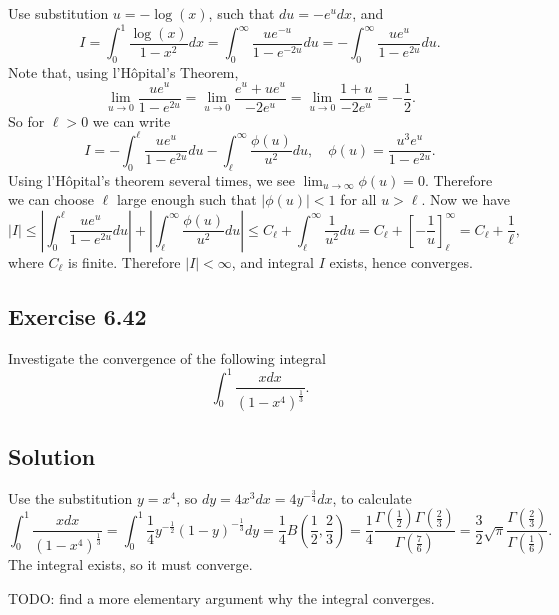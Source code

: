 Use substitution $u = -\log(x)$, such that $du = -e^{u}dx$, and
\begin{equation*}
    I = \int_0^1 \frac{\log(x)}{1 - x^2} dx
        = \int_0^{\infty} \frac{u e^{-u}}{1 - e^{-2u}} du
        = - \int_0^{\infty} \frac{u e^{u}}{1 - e^{2u}} du.
\end{equation*}
Note that, using l'H\^opital's Theorem,
\begin{equation*}
    \lim_{u \to 0} \frac{u e^{u}}{1 - e^{2u}}
        = \lim_{u \to 0} \frac{e^{u} + u e^{u}}{-2 e^{u}}
        = \lim_{u \to 0} \frac{1 + u}{-2e^u}
        = -\frac{1}{2}.
\end{equation*}
So for $\ell > 0$ we can write
\begin{equation*}
    I = -\int_0^{\ell} \frac{u e^{u}}{1 - e^{2u}} du - \int_{\ell}^{\infty} \frac{\phi(u)}{u^2} du,
        \quad \phi(u) = \frac{u^3 e^{u}}{1 - e^{2u}}.
\end{equation*}
Using l'H\^opital's theorem several times, we see $\lim_{u \to \infty} \phi(u) = 0$.
Therefore we can choose $\ell$ large enough such that $|\phi(u)| < 1$ for all $u > \ell$.
Now we have
\begin{equation*}
    |I| \leq \left| \int_0^{\ell} \frac{u e^u}{1 - e^{2u}} du \right|
            + \left| \int_{\ell}^{\infty} \frac{\phi(u)}{u^2} du \right|
        \leq C_{\ell} + \int_{\ell}^{\infty} \frac{1}{u^2} du
        = C_{\ell} + \left[ -\frac{1}{u} \right]_{\ell}^{\infty}
        = C_{\ell} + \frac{1}{\ell},
\end{equation*}
where $C_{\ell}$ is finite.
Therefore $|I| < \infty$, and integral $I$ exists, hence converges.


\subsection*{Exercise 6.42}

Investigate the convergence of the following integral
\begin{equation*}
    \int_0^1 \frac{x dx}{(1 - x^4)^{\frac{1}{3}}}.
\end{equation*}

\subsection*{Solution}

Use the substitution $y = x^4$, so $dy = 4 x^3 dx = 4 y^{-\frac{3}{4}} dx$, to calculate
\begin{equation*}
    \int_0^1 \frac{x dx}{(1 - x^4)^{\frac{1}{3}}}
        = \int_0^1 \frac{1}{4} y^{-\frac{1}{2}} (1 - y)^{-\frac{1}{3}} dy
        = \frac{1}{4} B(\frac{1}{2}, \frac{2}{3})
        = \frac{1}{4} \frac{\Gamma(\frac{1}{2}) \Gamma(\frac{2}{3})}{\Gamma(\frac{7}{6})}
        = \frac{3}{2} \sqrt{\pi} \frac{\Gamma(\frac{2}{3})}{\Gamma(\frac{1}{6})}.
\end{equation*}
The integral exists, so it must converge.

TODO: find a more elementary argument why the integral converges.
